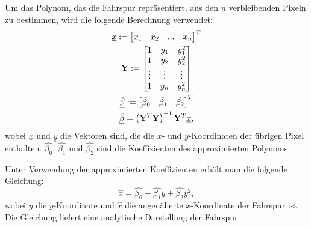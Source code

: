\documentclass[arbeit=studie,oneside,BCOR=12mm]{ArbeitRST}
\begin{document}
Um das Polynom, das die Fahrspur repräsentiert, aus den $n$ verbleibenden
Pixeln zu bestimmen, wird die folgende Berechnung verwendet:
\begin{gather}
    \underline{x} := \begin{bmatrix} x_1 & x_2 & ... & x_n \end{bmatrix}^T \\
    \bold{Y} := \begin{bmatrix} 1 & y_1 & y_1^2 \\ 1 & y_2 & y_2^2 \\ \vdots & \vdots & \vdots \\ 1 & y_n & y_n^2 \end{bmatrix} \\
    \underline{\hat{\beta}} := \begin{bmatrix} \hat{\beta_0} & \hat{\beta_1} & \hat{\beta_2} \end{bmatrix}^T \\
    \underline{\hat{\beta}} = \left(\bold{Y}^T\bold{Y}\right)^{-1}\bold{Y}^T\underline{x},
\end{gather}
wobei $\underline{x}$ und $\underline{y}$ die Vektoren sind, die die $x$- und
$y$-Koordinaten der übrigen Pixel enthalten. $\hat{\beta_0}$, $\hat{\beta_1}$ und
$\hat{\beta_2}$ sind die Koeffizienten des approximierten Polynoms. 

Unter Verwendung der approximierten Koeffizienten erhält man die folgende Gleichung:
\begin{equation}
    \hat{x} = \hat{\beta_0} + \hat{\beta_1}y + \hat{\beta_2}y^2,
\end{equation}
wobei $y$ die $y$-Koordinate und $\hat{x}$ die angenäherte $x$-Koordinate der
Fahrspur ist. Die Gleichung liefert eine analytische Darstellung der Fahrspur. 
\end{document}
